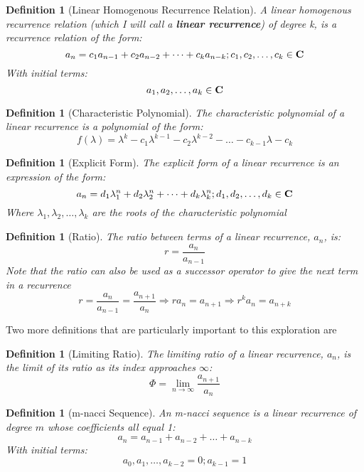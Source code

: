 \documentclass[11pt]{article}
\newtheorem{definition}[theorem]{Definition}
\begin{document}
\begin{definition}[Linear Homogenous Recurrence Relation] A linear homogenous recurrence relation (which I will call a \textbf{linear recurrence}) of degree \mbox{k}, is a recurrence relation of the form:
    $$a_n=c_1a_{n-1}+c_2a_{n-2}+\dots +c_ka_{n-k}; c_1,c_2,\dots,c_k\in \mbox{\textbf{C}}$$ 
    With initial terms: 
    $$a_1,a_2,\dots,a_k\in\mbox{\textbf{C}}$$
\end{definition}

\begin{definition}[Characteristic Polynomial] The characteristic polynomial of a linear recurrence is a polynomial of the form:
    $$f(\lambda) = \lambda^{k}-c_1\lambda^{k-1}-c_2\lambda^{k-2}-\dots-c_{k-1}\lambda-c_k$$ 
\end{definition}

\begin{definition}[Explicit Form] The explicit form of a linear recurrence is an expression of the form:
    $$a_n=d_1\lambda_1^n+d_2\lambda_2^n+\dots+d_k\lambda_k^n; d_1,d_2,\dots,d_k \in\mbox{\textbf{C}}$$ 
    Where \mbox{$\lambda_1,\lambda_2,\dots,\lambda_k$} are the roots of the characteristic polynomial
\end{definition}

\begin{definition}[Ratio] The ratio between terms of a linear recurrence, $a_n$, is:
    $$r=\frac{a_n}{a_{n-1}}$$
    Note that the ratio can also be used as a successor operator to give the next term in a recurrence 
    $$r=\frac{a_n}{a_{n-1}}=\frac{a_{n+1}}{a_{n}}\Rightarrow r a_n=a_{n+1}\Rightarrow r^k a_n=a_{n+k}$$
\end{definition}

Two more definitions that are particularly important to this exploration are 
\begin{definition}[Limiting Ratio] The limiting ratio of a linear recurrence, $a_n$, is the limit of its ratio as its index approaches $\infty$:
    $$\Phi=\lim_{n\to\infty}\frac{a_{n+1}}{a_{n}}$$
\end{definition}

\begin{definition}[m-nacci Sequence] An m-nacci sequence is a linear recurrence of degree \(m\) whose coefficients all equal 1:
    $$a_n=a_{n-1}+a_{n-2}+\dots +a_{n-k}$$ 
    With initial terms: 
    $$a_0,a_1,\dots,a_{k-2}=0;a_{k-1}=1$$
\end{definition}
\end{document}
